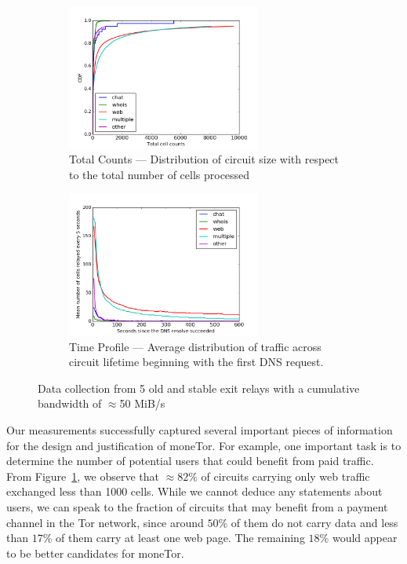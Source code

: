 \begin{figure}[t] \centering
\begin{subfigure}[t]{0.47\textwidth} \centering\centering
  \includegraphics[width=0.7\textwidth]{images/totcellcountscdf.png}
  \caption{Total Counts --- Distribution of circuit size with respect to the
    total number of cells processed}
\label{fig:statsb}
\end{subfigure}
\begin{subfigure}[t]{0.47\textwidth} \centering
  \includegraphics[width=0.7\textwidth]{images/exitmeasurement.png}
  \caption{Time Profile --- Average distribution of traffic across circuit
    lifetime beginning with the first DNS request.}
  \label{fig:statsa}
\end{subfigure}
\caption{Data collection from 5 old and stable exit relays with a cumulative
  bandwidth of $\approx$50 MiB/s}
\label{fig:stats}
\end{figure}


Our measurements successfully captured several important pieces of information
for the design and justification of moneTor. For example, one important task is
to determine the number of potential users that could benefit from paid traffic.
From Figure~\ref{fig:statsb}, we observe that $\approx 82\%$ of circuits
carrying only web traffic exchanged less than 1000 cells. While we cannot deduce
any statements about users, we can speak to the fraction of circuits that may
benefit from a payment channel in the Tor network, since around $50\%$ of them
do not carry data and less than $17\%$ of them carry at least one web page. The
remaining $18\%$ would appear to be better candidates for moneTor.

